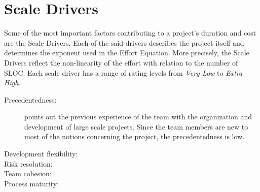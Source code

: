 \section{Scale Drivers}
Some of the most important factors contributing to a project's duration and cost are the Scale Drivers. Each of the said drivers describes the project itself and determines the exponent used in the Effort Equation. More precisely, the Scale Drivers reflect the non-linearity of the effort with relation to the number of SLOC. Each scale driver has a range of rating levels from \textit{Very Low} to \textit{Extra High}.

\begin{description}
\item[Precedentedness:] points out the previous experience of the team with the organization and development of large scale projects. Since the team members are new to most of the notions concerning the project, the precedentedness is low.
\item[Development flexibility:]
\item[Risk resolution:]
\item[Team cohesion:]
\item[Process maturity:]
\end{description}